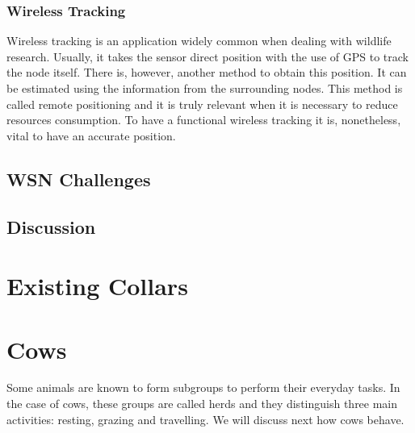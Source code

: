 \subsubsection{Wireless Tracking}
\label{subsubsection:wireless_tracking}
Wireless tracking is an application widely common when dealing with wildlife research. Usually,
it takes the sensor direct position with the use of GPS to track the node itself. There is,
however, another method to obtain this position. It can be estimated using the information
from the surrounding nodes. This method is called remote positioning and it is truly relevant
when it is necessary to reduce resources consumption. To have a functional wireless tracking
it is, nonetheless, vital to have an accurate position.



\subsection{WSN Challenges}

\subsection{Discussion}



\section{Existing Collars}
\label{sec:existing_collars}


\section{Cows}
\label{sec:cows}
Some animals are known to form subgroups to perform their everyday tasks. In the case of
cows, these groups are called herds and they distinguish three main activities: resting,
grazing and travelling. We will discuss next how cows behave.

